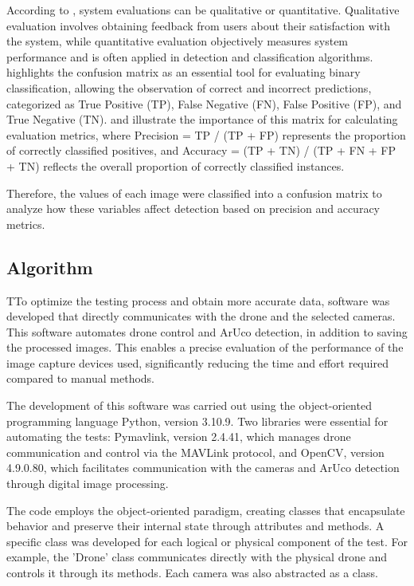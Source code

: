\documentclass[letterpaper]{article}
\begin{document}
According to \cite{dalianis2018evaluation}, system evaluations can be qualitative or quantitative. Qualitative evaluation involves obtaining feedback from users about their satisfaction with the system, while quantitative evaluation objectively measures system performance and is often applied in detection and classification algorithms. \cite{powers2008evaluation} highlights the confusion matrix as an essential tool for evaluating binary classification, allowing the observation of correct and incorrect predictions, categorized as True Positive (TP), False Negative (FN), False Positive (FP), and True Negative (TN). \cite{varoquaux2023evaluating} and \cite{markoulidakis2021multiclass} illustrate the importance of this matrix for calculating evaluation metrics, where Precision = TP / (TP + FP) represents the proportion of correctly classified positives, and Accuracy = (TP + TN) / (TP + FN + FP + TN) reflects the overall proportion of correctly classified instances.

Therefore, the values of each image were classified into a confusion matrix to analyze how these variables affect detection based on precision and accuracy metrics.

\subsection{Algorithm}

TTo optimize the testing process and obtain more accurate data, software was developed that directly communicates with the drone and the selected cameras. This software automates drone control and ArUco detection, in addition to saving the processed images. This enables a precise evaluation of the performance of the image capture devices used, significantly reducing the time and effort required compared to manual methods.

The development of this software was carried out using the object-oriented programming language Python, version 3.10.9. Two libraries were essential for automating the tests: Pymavlink, version 2.4.41, which manages drone communication and control via the MAVLink protocol, and OpenCV, version 4.9.0.80, which facilitates communication with the cameras and ArUco detection through digital image processing.

The code employs the object-oriented paradigm, creating classes that encapsulate behavior and preserve their internal state through attributes and methods. A specific class was developed for each logical or physical component of the test. For example, the 'Drone' class communicates directly with the physical drone and controls it through its methods. Each camera was also abstracted as a class.
\end{document}
